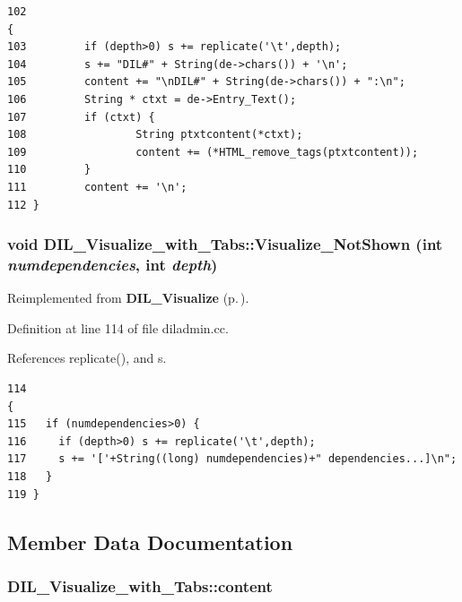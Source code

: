 \footnotesize\begin{verbatim}102                                                                          {
103         if (depth>0) s += replicate('\t',depth);
104         s += "DIL#" + String(de->chars()) + '\n';
105         content += "\nDIL#" + String(de->chars()) + ":\n";
106         String * ctxt = de->Entry_Text();
107         if (ctxt) {
108                 String ptxtcontent(*ctxt);
109                 content += (*HTML_remove_tags(ptxtcontent));
110         }
111         content += '\n';
112 }
\end{verbatim}\normalsize 
{}
\subsubsection{\setlength{\rightskip}{0pt plus 5cm}void DIL\_\-Visualize\_\-with\_\-Tabs::Visualize\_\-Not\-Shown (int {\em numdependencies}, int {\em depth})\hspace{0.3cm}{\tt  [virtual]}}\label{classDIL__Visualize__with__Tabs_a3}




Reimplemented from {\bf DIL\_\-Visualize} {\rm (p.\,\pageref{classDIL__Visualize_a6})}.

Definition at line 114 of file diladmin.cc.

References replicate(), and s.



\footnotesize\begin{verbatim}114                                                                                {
115   if (numdependencies>0) {
116     if (depth>0) s += replicate('\t',depth);
117     s += '['+String((long) numdependencies)+" dependencies...]\n";
118   }
119 }
\end{verbatim}\normalsize 


\subsection{Member Data Documentation}
\subsubsection{ DIL\_\-Visualize\_\-with\_\-Tabs::content\hspace{0.3cm}{\tt  [protected]}}\label{classDIL__Visualize__with__Tabs_n1}




